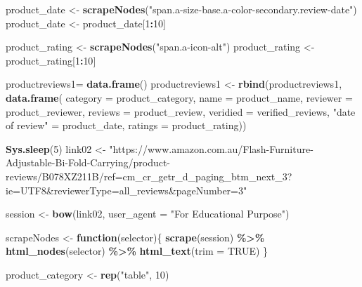 \documentclass[
]{article}
\newenvironment{Shaded}{\begin{snugshade}}{\end{snugshade}}
\newcommand{\AttributeTok}[1]{\textcolor[rgb]{0.13,0.29,0.53}{#1}}
\newcommand{\ConstantTok}[1]{\textcolor[rgb]{0.56,0.35,0.01}{#1}}
\newcommand{\ControlFlowTok}[1]{\textcolor[rgb]{0.13,0.29,0.53}{\textbf{#1}}}
\newcommand{\DecValTok}[1]{\textcolor[rgb]{0.00,0.00,0.81}{#1}}
\newcommand{\FunctionTok}[1]{\textcolor[rgb]{0.13,0.29,0.53}{\textbf{#1}}}
\newcommand{\NormalTok}[1]{#1}
\newcommand{\OtherTok}[1]{\textcolor[rgb]{0.56,0.35,0.01}{#1}}
\newcommand{\SpecialCharTok}[1]{\textcolor[rgb]{0.81,0.36,0.00}{\textbf{#1}}}
\newcommand{\StringTok}[1]{\textcolor[rgb]{0.31,0.60,0.02}{#1}}
\begin{document}
\begin{Shaded}
\begin{Highlighting}[]
\NormalTok{  product\_date }\OtherTok{\textless{}{-}} \FunctionTok{scrapeNodes}\NormalTok{(}\StringTok{"span.a{-}size{-}base.a{-}color{-}secondary.review{-}date"}\NormalTok{)}
\NormalTok{  product\_date }\OtherTok{\textless{}{-}}\NormalTok{ product\_date[}\DecValTok{1}\SpecialCharTok{:}\DecValTok{10}\NormalTok{]}
  
\NormalTok{  product\_rating }\OtherTok{\textless{}{-}} \FunctionTok{scrapeNodes}\NormalTok{(}\StringTok{"span.a{-}icon{-}alt"}\NormalTok{)}
\NormalTok{  product\_rating }\OtherTok{\textless{}{-}}\NormalTok{ product\_rating[}\DecValTok{1}\SpecialCharTok{:}\DecValTok{10}\NormalTok{]}
  
\NormalTok{  productreviews1}\OtherTok{=} \FunctionTok{data.frame}\NormalTok{()}
\NormalTok{  productreviews1 }\OtherTok{\textless{}{-}} \FunctionTok{rbind}\NormalTok{(productreviews1, }\FunctionTok{data.frame}\NormalTok{(}
                      \AttributeTok{category =}\NormalTok{ product\_category,}
                      \AttributeTok{name =}\NormalTok{ product\_name,}
                      \AttributeTok{reviewer =}\NormalTok{ product\_reviewer,}
                      \AttributeTok{reviews =}\NormalTok{ product\_review,}
                      \AttributeTok{veridied =}\NormalTok{ verified\_reviews,}
                      \StringTok{"date of review"} \OtherTok{=}\NormalTok{ product\_date,}
                      \AttributeTok{ratings =}\NormalTok{ product\_rating))}

  
 \FunctionTok{Sys.sleep}\NormalTok{(}\DecValTok{5}\NormalTok{)}
\NormalTok{link02 }\OtherTok{\textless{}{-}} \StringTok{"https://www.amazon.com.au/Flash{-}Furniture{-}Adjustable{-}Bi{-}Fold{-}Carrying/product{-}reviews/B078XZ211B/ref=cm\_cr\_getr\_d\_paging\_btm\_next\_3?ie=UTF8\&reviewerType=all\_reviews\&pageNumber=3"}


\NormalTok{  session }\OtherTok{\textless{}{-}} \FunctionTok{bow}\NormalTok{(link02,}
               \AttributeTok{user\_agent =} \StringTok{"For Educational Purpose"}\NormalTok{)}

\NormalTok{  scrapeNodes }\OtherTok{\textless{}{-}} \ControlFlowTok{function}\NormalTok{(selector)\{}
    \FunctionTok{scrape}\NormalTok{(session) }\SpecialCharTok{\%\textgreater{}\%}
      \FunctionTok{html\_nodes}\NormalTok{(selector) }\SpecialCharTok{\%\textgreater{}\%}
      \FunctionTok{html\_text}\NormalTok{(}\AttributeTok{trim =} \ConstantTok{TRUE}\NormalTok{)}
\NormalTok{  \}}

\NormalTok{  product\_category }\OtherTok{\textless{}{-}} \FunctionTok{rep}\NormalTok{(}\StringTok{"table"}\NormalTok{, }\DecValTok{10}\NormalTok{)}


\end{Highlighting}
\end{Shaded}
\end{document}
